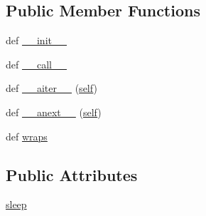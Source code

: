 \subsection*{Public Member Functions}
\begin{DoxyCompactItemize}
\item 
def \hyperlink{classpip_1_1__vendor_1_1tenacity_1_1__asyncio_1_1AsyncRetrying_a5b1bef8f976522a92769c8dd2091e1a7}{\+\_\+\+\_\+init\+\_\+\+\_\+}
\item 
def \hyperlink{classpip_1_1__vendor_1_1tenacity_1_1__asyncio_1_1AsyncRetrying_ae22e6d90f581aab2ad2df19d492685ff}{\+\_\+\+\_\+call\+\_\+\+\_\+}
\item 
def \hyperlink{classpip_1_1__vendor_1_1tenacity_1_1__asyncio_1_1AsyncRetrying_af8c3007c9855d2c26051ac90731db408}{\+\_\+\+\_\+aiter\+\_\+\+\_\+} (\hyperlink{classpip_1_1__vendor_1_1tenacity_1_1__asyncio_1_1AsyncRetrying_a19ae657cf1ee36b4cb6bcb35bfe27793}{self})
\item 
def \hyperlink{classpip_1_1__vendor_1_1tenacity_1_1__asyncio_1_1AsyncRetrying_add96ea5a60f643f3e6b38f3ad3732816}{\+\_\+\+\_\+anext\+\_\+\+\_\+} (\hyperlink{classpip_1_1__vendor_1_1tenacity_1_1__asyncio_1_1AsyncRetrying_a19ae657cf1ee36b4cb6bcb35bfe27793}{self})
\item 
def \hyperlink{classpip_1_1__vendor_1_1tenacity_1_1__asyncio_1_1AsyncRetrying_a72459c8b70660c5a1acf45d09db8a34d}{wraps}
\end{DoxyCompactItemize}
\subsection*{Public Attributes}
\begin{DoxyCompactItemize}
\item 
\hyperlink{classpip_1_1__vendor_1_1tenacity_1_1__asyncio_1_1AsyncRetrying_a3cc257febda32aa799857ce7880f22f3}{sleep}
\end{DoxyCompactItemize}
